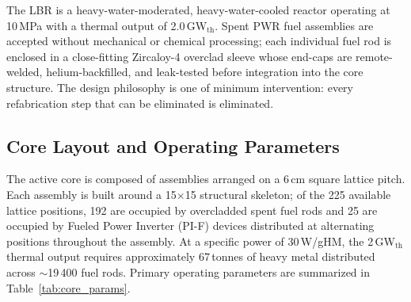 
The LBR is a heavy-water-moderated, heavy-water-cooled reactor operating at
10\,MPa with a thermal output of 2.0\,GW$_\text{th}$. Spent PWR fuel
assemblies are accepted without mechanical or chemical processing; each
individual fuel rod is enclosed in a close-fitting Zircaloy-4 overclad sleeve
whose end-caps are remote-welded, helium-backfilled, and leak-tested before
integration into the core structure. The design philosophy is one of minimum
intervention: every refabrication step that can be eliminated is eliminated.

\subsection{Core Layout and Operating Parameters}

The active core is composed of assemblies arranged on a 6\,cm square lattice
pitch. Each assembly is built around a 15$\times$15 structural skeleton;
of the 225 available lattice positions, 192 are occupied by overcladded spent
fuel rods and 25 are occupied by Fueled Power Inverter (PI-F) devices
distributed at alternating positions throughout the assembly. At a specific
power of 30\,W/gHM, the 2\,GW$_\text{th}$ thermal output requires
approximately 67\,tonnes of heavy metal distributed across $\sim$19\,400 fuel
rods. Primary operating parameters are summarized in
Table~\ref{tab:core_params}.

